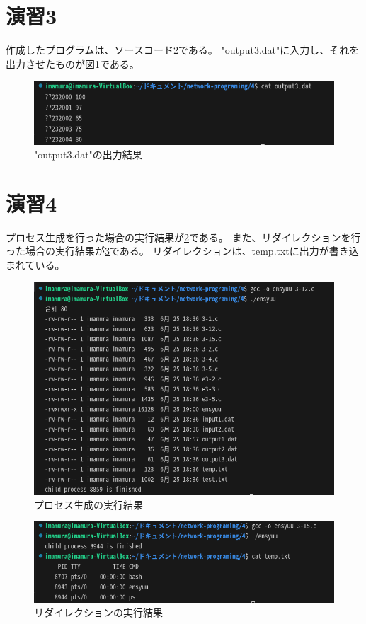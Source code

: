 \documentclass[documentclass]{jsarticle}
\begin{document}
\section*{演習3}
作成したプログラムは、ソースコード2である。
"output3.dat"に入力し、それを出力させたものが図\ref*{fig:3-1}である。

\begin{figure}[H]
  \begin{center}
    \includegraphics*[scale=0.8]{figure/3-1.png}
  \end{center}
  \caption{"output3.dat"の出力結果}
  \label{fig:3-1}
\end{figure}

\section*{演習4}
プロセス生成を行った場合の実行結果が\ref*{fig:4-1}である。
また、リダイレクションを行った場合の実行結果が\ref*{fig:4-2}である。
リダイレクションは、temp.txtに出力が書き込まれている。
\begin{figure}[H]
  \begin{center}
    \includegraphics*[scale=0.8]{figure/4-1.png}
  \end{center}
  \caption{プロセス生成の実行結果}
  \label{fig:4-1}
\end{figure}
\begin{figure}[H]
  \begin{center}
    \includegraphics*[scale=0.8]{figure/4-2.png}
  \end{center}
  \caption{リダイレクションの実行結果}
  \label{fig:4-2}
\end{figure}
\end{document}
